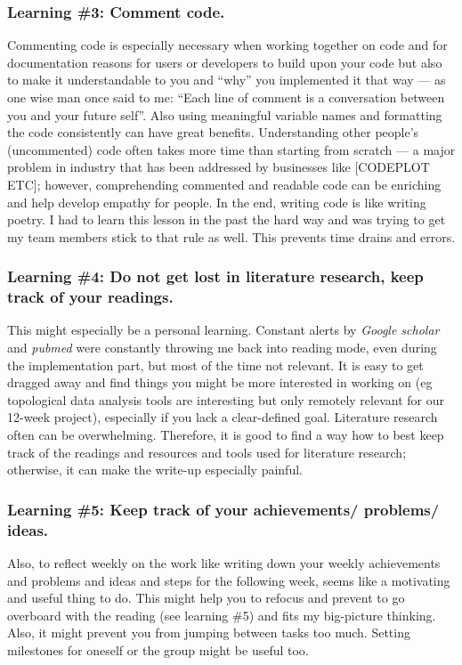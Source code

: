 \documentclass[journal, a4paper]{IEEEtran}
\begin{document}
\hfill
\subsubsection{Learning \#3: Comment code.}
Commenting code is especially necessary when working together on code and for documentation reasons for users or developers to build upon your code but also to make it understandable to you and “why” you implemented it that way — as one wise man once said to me: “Each line of comment is a conversation between you and your future self”. Also using meaningful variable names and formatting the code consistently can have great benefits.
Understanding other people’s (uncommented) code often takes more time than starting from scratch — a major problem in industry that has been addressed by businesses like [CODEPLOT ETC]; however, comprehending commented and readable code can be enriching and help develop empathy for people. In the end, writing code is like writing poetry. 
I had to learn this lesson in the past the hard way
and was trying to get my team members stick to that rule as well. This prevents time drains and errors. 

\hfill
\subsubsection{Learning \#4: Do not get lost in literature research, keep track of your readings.}
This might especially be a personal learning. Constant alerts by \textit{Google scholar} and \textit{pubmed} were constantly throwing me back into reading mode, even during the implementation part, but most of the time not relevant. It is easy to get dragged away and find things you might be more interested in working on (eg topological data analysis tools are interesting but only remotely relevant for our 12-week project), especially if you lack a clear-defined goal. Literature research often can be overwhelming. Therefore, it is good to find a way how to best keep track of the readings and resources and tools used for literature research; otherwise, it can make the write-up especially painful. %

\hfill
\subsubsection{Learning \#5: Keep track of your achievements/ problems/ ideas.}
Also, to reflect weekly on the work like writing down your weekly achievements and problems and ideas and steps for the following week, seems like a motivating and useful thing to do. This might help you to refocus and prevent to go overboard with the reading (see learning \#5) and fits my big-picture thinking. Also, it might prevent you from jumping between tasks too much. Setting milestones for oneself or the group might be useful too. 
\end{document}
